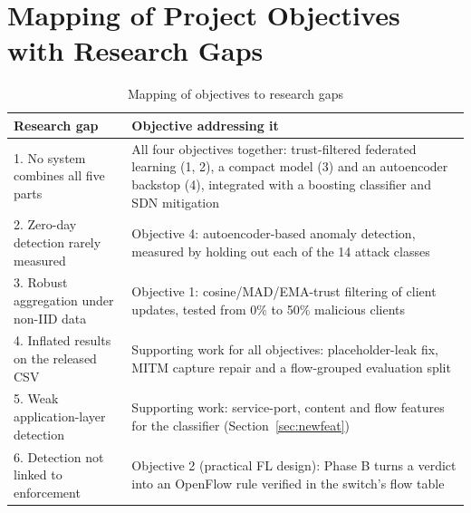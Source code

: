 \section{Mapping of Project Objectives with Research Gaps}
\begin{table}[H]
\centering
\renewcommand{\arraystretch}{1.3}
\begin{tabular}{|p{6.2cm}|p{7.3cm}|}
\hline
\textbf{Research gap} & \textbf{Objective addressing it} \\ \hline
1. No system combines all five parts & All four objectives together: trust-filtered federated learning (1, 2), a compact model (3) and an autoencoder backstop (4), integrated with a boosting classifier and SDN mitigation \\ \hline
2. Zero-day detection rarely measured & Objective 4: autoencoder-based anomaly detection, measured by holding out each of the 14 attack classes \\ \hline
3. Robust aggregation under non-IID data & Objective 1: cosine/MAD/EMA-trust filtering of client updates, tested from 0\% to 50\% malicious clients \\ \hline
4. Inflated results on the released CSV & Supporting work for all objectives: placeholder-leak fix, MITM capture repair and a flow-grouped evaluation split \\ \hline
5. Weak application-layer detection & Supporting work: service-port, content and flow features for the classifier (Section~\ref{sec:newfeat}) \\ \hline
6. Detection not linked to enforcement & Objective 2 (practical FL design): Phase B turns a verdict into an OpenFlow rule verified in the switch's flow table \\ \hline
\end{tabular}
\caption{Mapping of objectives to research gaps}
\end{table}

